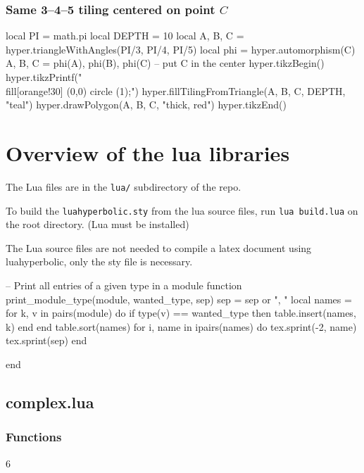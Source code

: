 \documentclass{article}
\begin{document}
\subsubsection{Same 3--4--5 tiling centered on point $C$}
\begin{codeandresult}
\begin{luacode*}
local PI = math.pi
local DEPTH = 10
local A, B, C = hyper.triangleWithAngles(PI/3, PI/4, PI/5)
local phi = hyper.automorphism(C)
A, B, C = phi(A), phi(B), phi(C) -- put C in the center
hyper.tikzBegin()
hyper.tikzPrintf("\\fill[orange!30] (0,0) circle (1);")
hyper.fillTilingFromTriangle(A, B, C, DEPTH, "teal")
hyper.drawPolygon(A, B, C, "thick, red")
hyper.tikzEnd()
\end{luacode*}
\end{codeandresult}

\newpage
\section{Overview of the lua libraries}

The Lua files are in the \verb+lua/+ subdirectory of the repo.

To build the \verb+luahyperbolic.sty+ from the lua source files, run \verb+lua build.lua+ on the root directory. (Lua must be installed)

The Lua source files are not needed to compile a latex document using luahyperbolic, only the sty file is necessary.

\begin{luacode*}
-- Print all entries of a given type in a module
function print_module_type(module, wanted_type, sep)
    sep = sep or ", "
    local names = {}
    for k, v in pairs(module) do
        if type(v) == wanted_type then
            table.insert(names, k)
        end
    end
    table.sort(names)
    for i, name in ipairs(names) do
        tex.sprint(-2, name)
        tex.sprint(sep)
    end

end
\end{luacode*}

\subsection{complex.lua}
\subsubsection*{Functions}
\begin{multicols}{6}
\noindent{}
\end{multicols}
\end{document}
